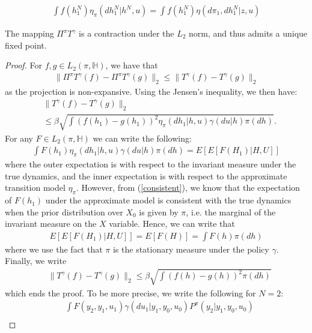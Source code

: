 \documentclass[10pt,a4paper]{amsart}
\begin{document}
\begin{align}\label{consistent}
\int f(h^N_1)\eta_\pi(dh_1^N|h^N,u) = \int f(h_1^N)\eta(d\pi_1,dh_1^N|z,u)
\end{align}

\begin{prop}\label{comp_contr}
The mapping $\Pi^\pi T^\gamma$ is a contraction under the $L_2$ norm, and thus admits a unique fixed point.
\end{prop}

\begin{proof}
For $f,g \in L_2(\pi,\mathds{H})$, we have that
\begin{align*}
\|\Pi^\pi T^\gamma (f) - \Pi^\pi T^\gamma (g)\|_2 \leq  \| T^\gamma (f) -  T^\gamma (g)\|_2 
\end{align*}
as the projection is non-expansive. Using the Jensen's inequality, we then have:
\begin{align*}
&\| T^\gamma (f) -  T^\gamma (g)\|_2\\
& \leq \beta \sqrt{   \int \left(f(h_1) - g(h_1)\right)^2\eta_\pi(dh_1|h,u)\gamma(du|h) \pi(dh) }.
\end{align*}
For any $F\in L_2(\pi,\mathds{H})$ we can write the following:
\begin{align*}
\int F(h_1)\eta_\pi(dh_1|h,u)\gamma(du|h) \pi(dh) = E\left[ {E}[F(H_1)|H,U] \right]
\end{align*}
where the outer expectation is with respect to the invariant measure under the true dynamics, and the inner expectation is with respect to the approximate  transition model $\eta_\pi$. However, from (\ref{consistent}), we know that the expectation of $F(h_1)$ under the approximate model is consistent with the true dynamics when the prior distribution over $X_0$ is given by $\pi$, i.e. the marginal of the invariant measure on the $X$ variable. Hence, we can write that
\begin{align*}
E\left[ {E}[F(H_1)|H,U] \right]= E[F(H)]=\int F(h)\pi(dh)
\end{align*}
where we use the fact that $\pi$ is the stationary measure under the policy $\gamma$. Finally, we write
\begin{align*}
&\| T^\gamma (f) -  T^\gamma (g)\|_2 \leq \beta \sqrt{   \int \left(f(h) - g(h)\right)^2\pi(dh) }
\end{align*}
which ends the proof.
To be more precise, we write the following for $N=2$:
\begin{align*}
&\int F(y_2,y_1,u_1)\gamma(du_1|y_1,y_0,u_0)P^\pi(y_2|y_1,y_0,u_0)\\

\end{align*}
\end{proof}
\end{document}
